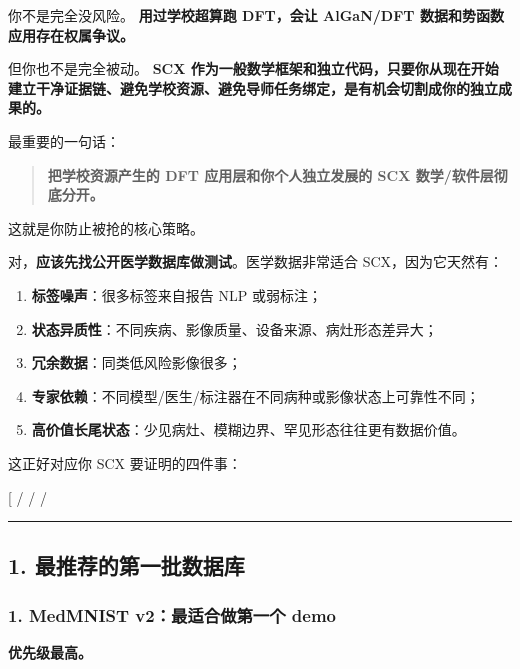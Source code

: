 \documentclass[
  12pt,
]{ctexart}
\providecommand{\tightlist}{%
  \setlength{\itemsep}{0pt}\setlength{\parskip}{0pt}}
\begin{document}
你不是完全没风险。 \textbf{用过学校超算跑 DFT，会让 AlGaN/DFT
数据和势函数应用存在权属争议。}

但你也不是完全被动。 \textbf{SCX
作为一般数学框架和独立代码，只要你从现在开始建立干净证据链、避免学校资源、避免导师任务绑定，是有机会切割成你的独立成果的。}

最重要的一句话：

\begin{quote}
\textbf{把学校资源产生的 DFT 应用层和你个人独立发展的 SCX
数学/软件层彻底分开。}
\end{quote}

这就是你防止被抢的核心策略。

对，\textbf{应该先找公开医学数据库做测试}。医学数据非常适合
SCX，因为它天然有：

\begin{enumerate}
\def\labelenumi{\arabic{enumi}.}
\tightlist
\item
  \textbf{标签噪声}：很多标签来自报告 NLP 或弱标注；
\item
  \textbf{状态异质性}：不同疾病、影像质量、设备来源、病灶形态差异大；
\item
  \textbf{冗余数据}：同类低风险影像很多；
\item
  \textbf{专家依赖}：不同模型/医生/标注器在不同病种或影像状态上可靠性不同；
\item
  \textbf{高价值长尾状态}：少见病灶、模糊边界、罕见形态往往更有数据价值。
\end{enumerate}

这正好对应你 SCX 要证明的四件事：

{[}  /  /  /
\text{expert-dependent}{]}

\begin{center}\rule{0.5\linewidth}{0.5pt}\end{center}

\subsection{1.
最推荐的第一批数据库}\label{ux6700ux63a8ux8350ux7684ux7b2cux4e00ux6279ux6570ux636eux5e93}

\subsubsection{1. MedMNIST v2：最适合做第一个
demo}\label{medmnist-v2ux6700ux9002ux5408ux505aux7b2cux4e00ux4e2a-demo}

\textbf{优先级最高。}
\end{document}
